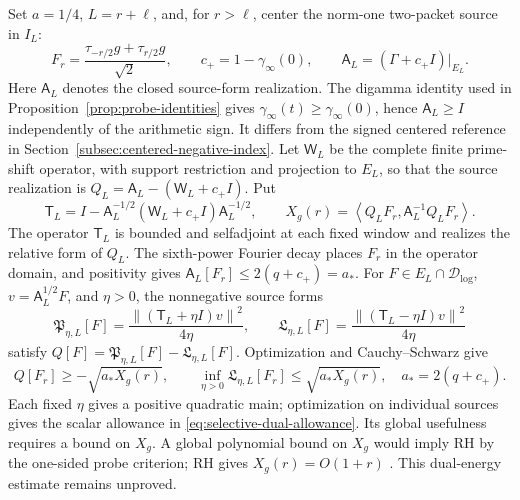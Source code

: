 \documentclass[11pt]{article}
\numberwithin{equation}{section}
\theoremstyle{definition}
\theoremstyle{remark}
\newcommand{\Id}{I}
\newcommand{\norm}[1]{\left\lVert #1\right\rVert}
\newcommand{\inner}[2]{\left\langle #1,#2\right\rangle}
\begin{document}
Set \(a=1/4\), \(L=r+\ell\), and, for \(r>\ell\), center the
norm-one two-packet source in \(I_L\):
\[
F_r=\frac{\tau_{-r/2}g+\tau_{r/2}g}{\sqrt2},\qquad
c_+=1-\gamma_\infty(0),\qquad
\mathsf A_L=(\Gamma+c_+\Id)|_{E_L}.
\]
Here \(\mathsf A_L\) denotes the closed source-form realization.
The digamma identity used in Proposition~\ref{prop:probe-identities}
gives \(\gamma_\infty(t)\ge\gamma_\infty(0)\), hence
\(\mathsf A_L\ge\Id\) independently of the arithmetic sign.
It differs from the signed centered reference in Section~\ref{subsec:centered-negative-index}.
Let \(\mathsf W_L\) be the complete finite prime-shift operator,
with support restriction and projection to \(E_L\), so that the source
realization is \(Q_L=\mathsf A_L-(\mathsf W_L+c_+\Id)\). Put
\[
\mathsf T_L=\Id-\mathsf A_L^{-1/2}(\mathsf W_L+c_+\Id)
\mathsf A_L^{-1/2},\qquad
X_g(r)=\inner{Q_LF_r}{\mathsf A_L^{-1}Q_LF_r}.
\]
The operator \(\mathsf T_L\) is bounded and selfadjoint at each
fixed window and realizes the relative form of \(Q_L\).
The sixth-power Fourier decay places \(F_r\) in the operator domain,
and positivity gives \(\mathsf A_L[F_r]\le2(q+c_+)=a_*\).
For \(F\in E_L\cap\mathcal D_{\log}\),
\(v=\mathsf A_L^{1/2}F\), and \(\eta>0\),
the nonnegative source forms
\[
\mathfrak P_{\eta,L}[F]=
\frac{\norm{(\mathsf T_L+\eta\Id)v}^2}{4\eta},\qquad
\mathfrak L_{\eta,L}[F]=
\frac{\norm{(\mathsf T_L-\eta\Id)v}^2}{4\eta}
\]
satisfy \(Q[F]=\mathfrak P_{\eta,L}[F]-\mathfrak L_{\eta,L}[F]\).
Optimization and Cauchy--Schwarz give
\begin{equation}\label{eq:selective-dual-allowance}
Q[F_r]\ge-\sqrt{a_*X_g(r)},\qquad
\inf_{\eta>0}\mathfrak L_{\eta,L}[F_r]\le\sqrt{a_*X_g(r)},
\quad a_*=2(q+c_+).
\end{equation}
Each fixed \(\eta\) gives a positive quadratic main; optimization on
individual sources gives the scalar allowance in
\eqref{eq:selective-dual-allowance}. Its global usefulness requires a
bound on \(X_g\). A global polynomial bound on \(X_g\) would imply
RH by the one-sided probe criterion; RH gives \(X_g(r)=O(1+r)\)
\cite{SelectiveLossNotes}. This dual-energy estimate remains unproved.
\end{document}
